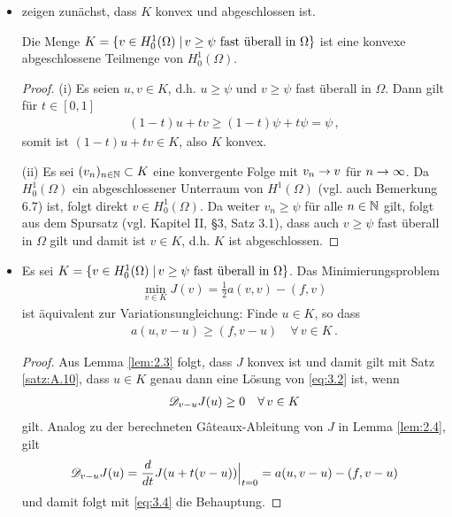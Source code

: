 \begin{itemize}
\item zeigen zunächst, dass $K$ konvex und abgeschlossen ist.
\begin{lemma}\label{lem:3.1}
Die Menge $K =  \{v \in H^1_0(\Omega) \;\vert\, v\ge \psi\text{ fast überall in }\Omega\}$ ist eine konvexe abgeschlossene Teilmenge von $H^1_0(\Omega)$.
\end{lemma}

\begin{proof}
(i) Es seien $u,v \in K$, d.h. $u \ge \psi$ und $v \ge \psi$ fast überall in $\Omega$. Dann gilt für $t \in [0,1]$
\begin{align*}
	(1-t) u + tv \ge (1-t)\psi + t \psi = \psi  \, ,
\end{align*}
somit ist $(1-t)u + tv \in K$, also $K$ konvex.

(ii) Es sei $(v_n)_{n\in \mathbb{N}}\subset K$ eine konvergente Folge mit $v_n \rightarrow v$ für $n\rightarrow \infty$. Da $H^1_0(\Omega)$ ein abgeschlossener Unterraum von $H^1(\Omega)$ (vgl. auch \cite{Walker} Bemerkung 6.7) ist, folgt direkt $v \in H^1_0(\Omega)$. Da weiter $v_n \ge \psi$ für alle $n \in \mathbb{N}$ gilt, folgt aus dem Spursatz (vgl. \cite{BraeFEM} Kapitel II, \S3, Satz 3.1), dass auch $v \ge \psi$ fast überall in $\Omega$ gilt und damit ist $v \in K$, d.h. $K$ ist abgeschlossen.
\end{proof}

\item \begin{satz}\label{satz:3.2}
Es sei $K =   \{v \in H^1_0(\Omega) \;\vert\, v\ge \psi\text{ fast überall in }\Omega\}$. Das Minimierungsproblem
\begin{align}\label{eq:3.2}
	\min_{v\in K} J(v) = \frac 1 2 a(v,v)-(f,v)
\end{align}
ist äquivalent zur Variationsungleichung: Finde $u \in K$, so dass
\begin{align}\label{eq:3.3}
	a(u,v-u) \ge (f,v-u) \quad \forall \, v \in K \, .
\end{align}
\end{satz}

\begin{proof}
Aus Lemma \ref{lem:2.3} folgt, dass $J$ konvex ist und damit gilt mit Satz \ref{satz:A.10}, dass $u \in K$ genau dann eine Lösung von \eqref{eq:3.2} ist, wenn
\begin{align}\label{eq:3.4}
	\mathscr D_{v-u} J(u) \ge 0 \quad \forall \, v \in K 
\end{align}
gilt. Analog zu der berechneten Gâteaux-Ableitung von $J$ in Lemma \ref{lem:2.4}, gilt
\[
	\mathscr D_{v-u} J(u) = \frac d{dt} J(u+t(v-u))\Big|_{t=0} = a(u,v-u) -(f,v-u)
\]
und damit folgt mit \eqref{eq:3.4} die Behauptung.
\end{proof}


\end{itemize}
